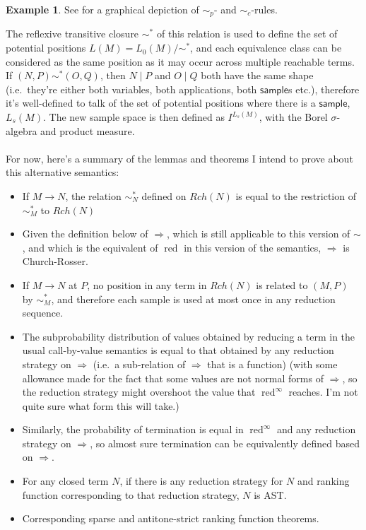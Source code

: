 \documentclass{article}
\newcommand{\tsample}{\textsf{sample}}
\DeclareMathOperator{\red}{red}
\theoremstyle{definition}
\newtheorem{example}{Example}
\theoremstyle{lemma}
\theoremstyle{remark}
\begin{document}
\begin{example}
See  for a graphical depiction of $\sim_p$- and $\sim_c$-rules.
\end{example}

The reflexive transitive closure $\sim^*$ of this relation is used to define the set of potential positions $L(M) = L_0(M) / \sim^*$, and each equivalence class can be considered as the same position as it may occur across multiple reachable terms. If $(N,P) \sim^* (O,Q)$, then $N \mid P$ and $O \mid Q$ both have the same shape (i.e.~they're either both variables, both applications, both $\tsample$s etc.), therefore it's well-defined to talk of the set of potential positions where there is a $\tsample$, $L_s(M)$. The new sample space is then defined as $I^{L_s(M)}$, with the Borel $\sigma$-algebra and product measure.

\paragraph{}
For now, here's a summary of the lemmas and theorems I intend to prove about this alternative semantics:
\begin{itemize}
    \item If $M \to N$, the relation $\sim_N^*$ defined on $Rch(N)$ is equal to the restriction of $\sim_M^*$ to $Rch(N)$ 
    \item Given the definition below of $\Rightarrow$, which is still applicable to this version of $\sim$, and which is the equivalent of $\red$ in this version of the semantics, $\Rightarrow$ is Church-Rosser.
    \item If $M \to N$ at $P$, no position in any term in $Rch(N)$ is related to $(M,P)$ by $\sim_M^*$, and therefore each sample is used at most once in any reduction sequence.
    \item The subprobability distribution of values obtained by reducing a term in the usual call-by-value semantics is equal to that obtained by any reduction strategy on $\Rightarrow$ (i.e.~a sub-relation of $\Rightarrow$ that is a function) (with some allowance made for the fact that some values are not normal forms of $\Rightarrow$, so the reduction strategy might overshoot the value that $\red^\infty$ reaches. I'm not quite sure what form this will take.)
    \item Similarly, the probability of termination is equal in $\red^\infty$ and any reduction strategy on $\Rightarrow$, so almost sure termination can be equivalently defined based on $\Rightarrow$.
    \item For any closed term $N$, if there is any reduction strategy for $N$ and ranking function corresponding to that reduction strategy, $N$ is AST.
    \item Corresponding sparse and antitone-strict ranking function theorems.
\end{itemize}
\end{document}
